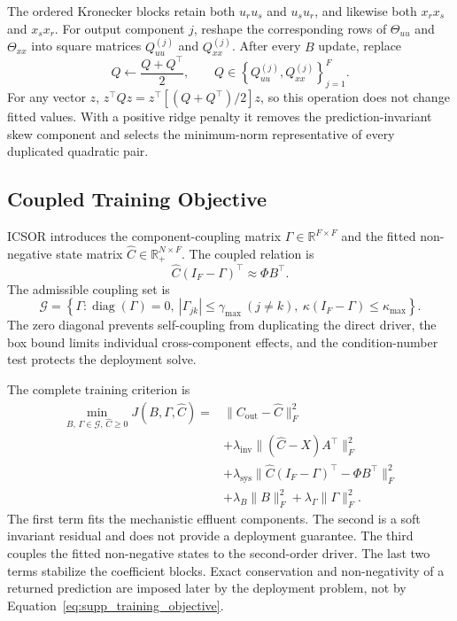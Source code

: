 \documentclass[a4paper,fleqn]{cas-sc}
\newcommand{\R}{\mathbb{R}}
\begin{document}
The ordered Kronecker blocks retain both $u_ru_s$ and $u_su_r$, and likewise both $x_rx_s$ and $x_sx_r$. For output component $j$, reshape the corresponding rows of $\Theta_{uu}$ and $\Theta_{xx}$ into square matrices $Q_{uu}^{(j)}$ and $Q_{xx}^{(j)}$. After every $B$ update, replace
\begin{equation}
\label{eq:supp_symmetry}
Q\leftarrow\frac{Q+Q^\top}{2},
\qquad
Q\in\left\{Q_{uu}^{(j)},Q_{xx}^{(j)}\right\}_{j=1}^{F}.
\end{equation}
For any vector $z$, $z^\top Qz=z^\top[(Q+Q^\top)/2]z$, so this operation does not change fitted values. With a positive ridge penalty it removes the prediction-invariant skew component and selects the minimum-norm representative of every duplicated quadratic pair.

\subsection{Coupled Training Objective}

ICSOR introduces the component-coupling matrix $\Gamma\in\R^{F\times F}$ and the fitted non-negative state matrix $\widehat C\in\R_+^{N\times F}$. The coupled relation is
\begin{equation}
\widehat C(I_F-\Gamma)^\top\approx\Phi B^\top.
\end{equation}
The admissible coupling set is
\begin{equation}
\label{eq:supp_gamma_set}
\mathcal G=\left\{\Gamma:\operatorname{diag}(\Gamma)=0,
\ |\Gamma_{jk}|\leq\gamma_{\max}\ (j\neq k),
\ \kappa(I_F-\Gamma)\leq\kappa_{\max}\right\}.
\end{equation}
The zero diagonal prevents self-coupling from duplicating the direct driver, the box bound limits individual cross-component effects, and the condition-number test protects the deployment solve.

The complete training criterion is
\begin{equation}
\label{eq:supp_training_objective}
\begin{aligned}
\min_{B,\,\Gamma\in\mathcal G,\,\widehat C\geq0}
J(B,\Gamma,\widehat C)
={}&\|C_{\mathrm{out}}-\widehat C\|_F^2\\
&+\lambda_{\mathrm{inv}}\|(\widehat C-X)A^\top\|_F^2\\
&+\lambda_{\mathrm{sys}}\|\widehat C(I_F-\Gamma)^\top-\Phi B^\top\|_F^2\\
&+\lambda_B\|B\|_F^2+\lambda_\Gamma\|\Gamma\|_F^2.
\end{aligned}
\end{equation}
The first term fits the mechanistic effluent components. The second is a soft invariant residual and does not provide a deployment guarantee. The third couples the fitted non-negative states to the second-order driver. The last two terms stabilize the coefficient blocks. Exact conservation and non-negativity of a returned prediction are imposed later by the deployment problem, not by Equation~\eqref{eq:supp_training_objective}.
\end{document}
